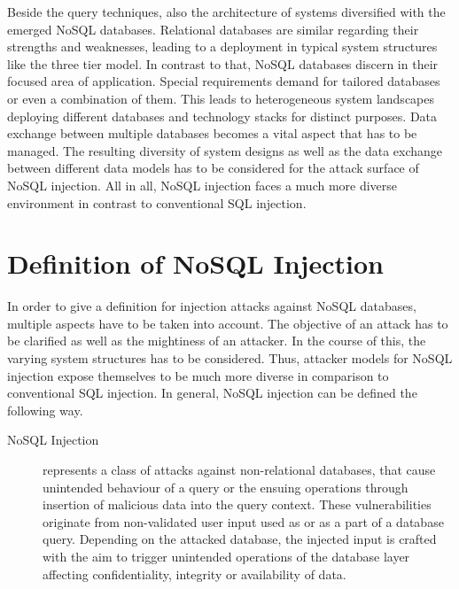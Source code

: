 Beside the query techniques, also the architecture of systems diversified with the emerged NoSQL databases. Relational databases are similar regarding their strengths and weaknesses, leading to a deployment in typical system structures like the three tier model. In contrast to that, NoSQL databases discern in their focused area of application. Special requirements demand for tailored databases or even a combination of them. This leads to heterogeneous system landscapes deploying different databases and technology stacks for distinct purposes. Data exchange between multiple databases becomes a vital aspect that has to be managed. The resulting diversity of system designs as well as the data exchange between different data models has to be considered for the attack surface of NoSQL injection. All in all, NoSQL injection faces a much more diverse environment in contrast to conventional SQL injection.

\section{Definition of NoSQL Injection}

In order to give a definition for injection attacks against NoSQL databases, multiple aspects have to be taken into account. The objective of an attack has to be clarified as well as the mightiness of an attacker. In the course of this, the varying system structures has to be considered. Thus, attacker models for NoSQL injection expose themselves to be much more diverse in comparison to conventional SQL injection. In general, NoSQL injection can be defined the following way.\\

\begin{description}
\item [NoSQL Injection] represents a class of attacks against non-relational databases, that cause unintended behaviour of a query or the ensuing operations through insertion of malicious data into the query context. These vulnerabilities originate from non-validated user input used as or as a part of a database query. Depending on the attacked database, the injected input is crafted with the aim to trigger unintended operations of the database layer affecting confidentiality, integrity or availability of data.
\end{description}

